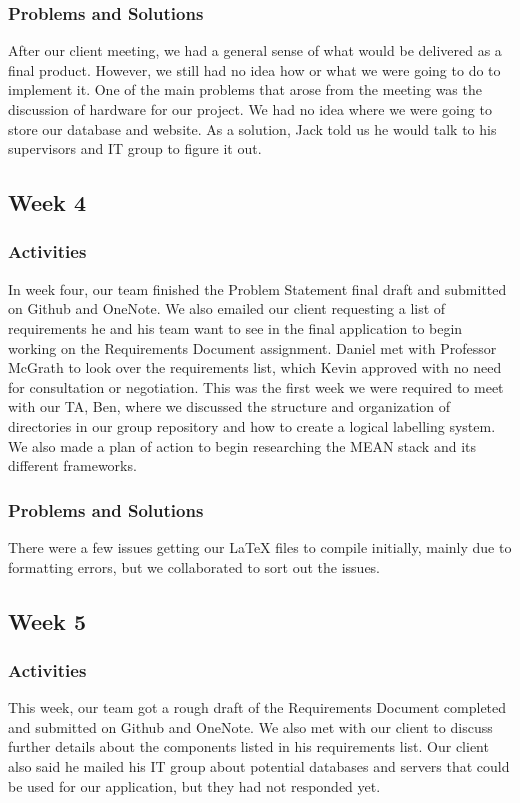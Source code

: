 \documentclass[journal,10pt,onecolumn,compsoc]{IEEEtran} \usepackage[margin=1.0in]{geometry} \usepackage{pdfpages}
\begin{document}
    \subsubsection{Problems and Solutions} 
	After our client meeting, we had a general sense of what would be delivered as a final product. However, we still had no idea how or what we were going to do to implement it. One of the main problems that arose from the meeting was the discussion of hardware for our project. We had no idea where we were going to store our database and website. As a solution, Jack told us he would talk to his supervisors and IT group to figure it out.
    \subsection{Week 4}
    \subsubsection{Activities} 
    In week four, our team finished the Problem Statement final draft and submitted on Github and OneNote. We also emailed our client requesting a list of requirements he and his team want to see in the final application to begin working on the Requirements Document assignment. Daniel met with Professor McGrath to look over the requirements list, which Kevin approved with no need for consultation or negotiation.
    \noindent This was the first week we were required to meet with our TA, Ben, where we discussed the structure and organization of directories in our group repository and how to create a logical labelling system. We also made a plan of action to begin researching the MEAN stack and its different frameworks.
    
    \subsubsection{Problems and Solutions} 
	There were a few issues getting our LaTeX files to compile initially, mainly due to formatting errors, but we collaborated to sort out the issues.
	
    \subsection{Week 5}    
    \subsubsection{Activities} 
    This week, our team got a rough draft of the Requirements Document completed and submitted on Github and OneNote. We also met with our client to discuss further details about the components listed in his requirements list. Our client also said he mailed his IT group about potential databases and servers that could be used for our application, but they had not responded yet.
	
\end{document}
